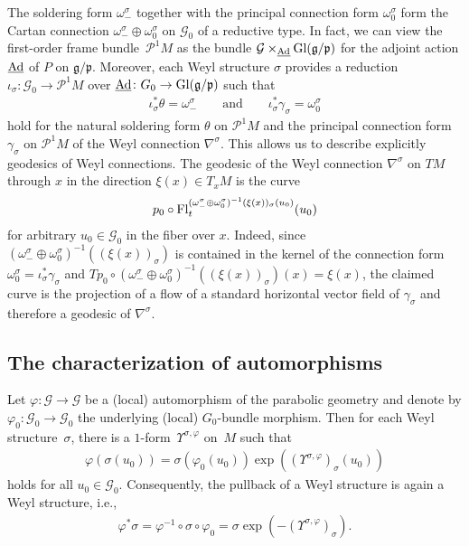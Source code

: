 \documentclass[10pt,a4paper]{amsart}
\newcommand{\om}{\omega}
\newcommand{\si}{\sigma}
\newcommand{\un}{\underline}
\newcommand{\ba}{\mathcal{G}}
\newcommand{\va}{\varphi}
\newcommand{\fg}{\mathfrak g}
\newcommand{\fp}{\mathfrak p}
\newcommand{\Ad}{{\rm Ad}}
\newcommand{\Fl}{{\rm Fl}}
\newcommand{\U}{\Upsilon}
\numberwithin{equation}{section}
\begin{document}
The soldering form $\om_-^\si$ together with the principal connection form $\om_{0}^\si$ form the Cartan connection $\om_-^\si\oplus\om_{0}^\si$ on $\ba_0$ of a reductive type. In fact, we can view the f\/irst-order frame bund\-le~$\mathcal{P}^1M$ as the bundle $\ba\times_{\un \Ad}{\rm Gl}(\fg/\fp)$ for the adjoint action $\un \Ad$ of $P$ on $\fg/\fp$. Moreover, each Weyl structure $\si$ provides a reduction $\iota_\si\colon \ba_0\to\mathcal{P}^1M$ over $\un \Ad\colon G_0\to {\rm Gl}(\fg/\fp)$ such that
\begin{gather*}\iota_\si^*\theta=\om_-^\si \qquad \text{and} \qquad \iota_\si^*\gamma_\si=\om_{0}^\si\end{gather*}
hold for the natural soldering form $\theta$ on $\mathcal{P}^1M$ and the principal connection form $\gamma_\si$ on $\mathcal{P}^1M$ of the Weyl connection $\nabla^\si$. This allows us to describe explicitly geodesics of Weyl connections. The geodesic of the Weyl connection $\nabla^\si$ on $TM$ through $x$ in the direction $\xi(x) \in T_xM$ is the curve \begin{gather}\label{geod}
p_0 \circ \Fl^{(\om_-^\si\oplus\om_{0}^\si)^{-1}(\xi(x))_\si(u_0)}_t(u_0)
\end{gather} for arbitrary $u_0\in \ba_0$ in the f\/iber over $x$. Indeed, since $(\om_-^\si\oplus\om_{0}^\si)^{-1}((\xi(x))_\si)$ is contained in the kernel of the connection form $\om_0^\si=\iota_\si^*\gamma_\si$ and $Tp_0\circ (\om_-^\si\oplus\om_{0}^\si)^{-1}((\xi(x))_\si)(x)=\xi(x)$, the claimed curve is the projection of a f\/low of a standard horizontal vector f\/ield of $\gamma_\si$ and therefore a geodesic of $\nabla^\si$.

\subsection{The characterization of automorphisms}\label{sec2.2}
Let $\va\colon \ba \to \ba$ be a (local) automorphism of the parabolic geometry and denote by $\va_0:\ba_0 \to \ba_0$ the underlying (local) $G_0$-bundle morphism. Then for each Weyl structure~$\si$, there is a $1$-form~$\U^{\si,\va}$ on~$M$ such that
\begin{gather} \label{action}
\va(\si(u_0))=\si(\va_0(u_0))\exp((\U^{\si,\va})_\si(u_0))
\end{gather}
holds for all $u_0\in \ba_0$. Consequently, the pullback of a Weyl structure is again a Weyl structure, i.e., \begin{gather*}\va^*\si=\va^{-1} \circ \si \circ \va_0=\si \exp(-(\U^{\si,\va})_\si).\end{gather*}
\end{document}
